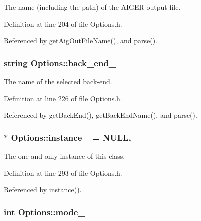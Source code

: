 The name (including the path) of the A\-I\-G\-E\-R output file. 



Definition at line 204 of file Options.\-h.



Referenced by get\-Aig\-Out\-File\-Name(), and parse().

\hypertarget{classOptions_ab049675ae9fd3fc7693dfa53266da8c8}{
\subsubsection[{back\-\_\-end\-\_\-}]{\setlength{\rightskip}{0pt plus 5cm}string Options\-::back\-\_\-end\-\_\-\hspace{0.3cm}{\ttfamily [protected]}}}\label{classOptions_ab049675ae9fd3fc7693dfa53266da8c8}


The name of the selected back-\/end. 



Definition at line 226 of file Options.\-h.



Referenced by get\-Back\-End(), get\-Back\-End\-Name(), and parse().

\hypertarget{classOptions_a9097fb97d94616d9166bc7e8df97a58a}{
\subsubsection[{instance\-\_\-}]{ $\ast$ Options\-::instance\-\_\- = N\-U\-L\-L\hspace{0.3cm}{\ttfamily [static]}, {\ttfamily [private]}}}\label{classOptions_a9097fb97d94616d9166bc7e8df97a58a}


The one and only instance of this class. 



Definition at line 293 of file Options.\-h.



Referenced by instance().

\hypertarget{classOptions_a4554d07501f73bbccb9e2628016f2d20}{
\subsubsection[{mode\-\_\-}]{\setlength{\rightskip}{0pt plus 5cm}int Options\-::mode\-\_\-\hspace{0.3cm}{\ttfamily [protected]}}}\label{classOptions_a4554d07501f73bbccb9e2628016f2d20}


